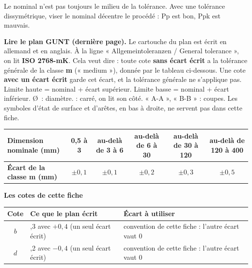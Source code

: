 \documentclass[10pt,a4paper]{article}
\begin{document}
\begin{tcolorbox}[retenir]Le nominal n'est pas toujours le milieu de la tolérance. Avec une tolérance dissymétrique, viser le nominal décentre le procédé : Pp est bon, Ppk est mauvais.\end{tcolorbox}
\providecommand{\carre}{\fbox{\rule{0pt}{1.1ex}\rule{1.1ex}{0pt}}}
\begin{tcolorbox}[boite,left=5pt,right=5pt,top=3pt,bottom=3pt]\footnotesize
\textbf{\color{uimm}Lire le plan GUNT (dernière page).} Le cartouche du plan est écrit en allemand et en anglais. À la ligne « Allgemeintoleranzen / General tolerance », on lit \textbf{ISO 2768-mK}. Cela veut dire : toute cote \textbf{sans écart écrit} a la tolérance générale de la classe \textbf{m} (« medium »), donnée par le tableau ci-dessous. Une cote \textbf{avec un écart écrit} garde cet écart, et la tolérance générale ne s'applique pas. Limite haute = nominal + écart supérieur. Limite basse = nominal + écart inférieur. \O\ : diamètre. \carre{} : carré, on lit son côté. « A-A », « B-B » : coupes. Les symboles d'état de surface et d'arêtes, en bas à droite, ne servent pas dans cette fiche.
\par\vspace{6pt}\noindent\renewcommand{\arraystretch}{1.2}\setlength{\tabcolsep}{4pt}
\begin{tabular}{|l|c|c|c|c|c|}\hline
\textbf{Dimension nominale (mm)} & 0,5 à 3 & au-delà de 3 à 6 & au-delà de 6 à 30 & au-delà de 30 à 120 & au-delà de 120 à 400\\\hline
\textbf{Écart de la classe m (mm)} & $\pm 0{,}1$ & $\pm 0{,}1$ & $\pm 0{,}2$ & $\pm 0{,}3$ & $\pm 0{,}5$\\\hline
\end{tabular}
\par\vspace{1pt}{\scriptsize Source : ISO 2768-1:1989, tolérances générales des dimensions linéaires, reprises dans la fiche GUNT « PT105f Tolérances ».}
\par\vspace{4pt}\textbf{Les cotes de cette fiche}\par\vspace{2pt}
\begin{tabularx}{\linewidth}{|c|>{\raggedright\arraybackslash}X|>{\raggedright\arraybackslash}X|}\hline
\textbf{Cote} & \textbf{Ce que le plan écrit} & \textbf{Écart à utiliser}\\\hline
$b$ & 30,3 avec $+0{,}4$ (un seul écart écrit) & convention de cette fiche : l'autre écart vaut $0$ \\\hline
$d$ & 55,2 avec $-0{,}4$ (un seul écart écrit) & convention de cette fiche : l'autre écart vaut $0$ \\\hline
\end{tabularx}
\end{tcolorbox}
\end{document}
